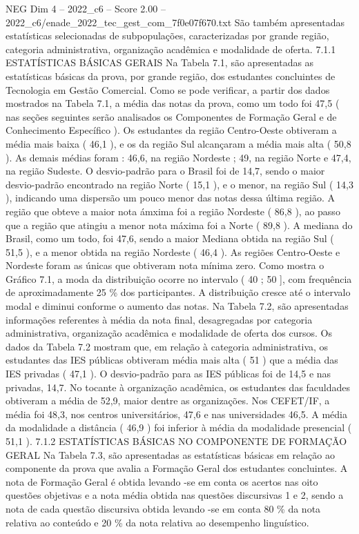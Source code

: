 \begin{textsample}{NEG Dim 4 – 2022\_c6 – Score 2.00 – 2022\_c6/enade\_2022\_tec\_gest\_com\_7f0e07f670.txt}
São também apresentadas estatísticas selecionadas de subpopulações, caracterizadas por grande região, categoria administrativa, organização acadêmica e modalidade de oferta. 7.1.1 ESTATÍSTICAS BÁSICAS GERAIS Na Tabela 7.1, são apresentadas as estatísticas básicas da prova, por grande região, dos estudantes concluintes de Tecnologia em Gestão Comercial.
Como se pode verificar, a partir dos dados mostrados na Tabela 7.1, a média das notas da prova, como um todo foi 47,5 ( nas seções seguintes serão analisados os Componentes de Formação Geral e de Conhecimento Específico ).
Os estudantes da região Centro-Oeste obtiveram a média mais baixa ( 46,1 ), e os da região Sul alcançaram a média mais alta ( 50,8 ).
As demais médias foram : 46,6, na região Nordeste ; 49, na região Norte e 47,4, na região Sudeste.
O desvio-padrão para o Brasil foi de 14,7, sendo o maior desvio-padrão encontrado na região Norte ( 15,1 ), e o menor, na região Sul ( 14,3 ), indicando uma dispersão um pouco menor das notas dessa última região.
A região que obteve a maior nota ámxima foi a região Nordeste ( 86,8 ), ao passo que a região que atingiu a menor nota máxima foi a Norte ( 89,8 ).
A mediana do Brasil, como um todo, foi 47,6, sendo a maior Mediana obtida na região Sul ( 51,5 ), e a menor obtida na região Nordeste ( 46,4 ).
As regiões Centro-Oeste e Nordeste foram as únicas que obtiveram nota mínima zero.
Como mostra o Gráfico 7.1, a moda da distribuição ocorre no intervalo ( 40 ; 50 ], com frequência de aproximadamente 25 \% dos participantes.
A distribuição cresce até o intervalo modal e diminui conforme o aumento das notas.
Na Tabela 7.2, são apresentadas informações referentes à média da nota final, desagregadas por categoria administrativa, organização acadêmica e modalidade de oferta dos cursos.
Os dados da Tabela 7.2 mostram que, em relação à categoria administrativa, os estudantes das IES públicas obtiveram média mais alta ( 51 ) que a média das IES privadas ( 47,1 ).
O desvio-padrão para as IES públicas foi de 14,5 e nas privadas, 14,7.
No tocante à organização acadêmica, os estudantes das faculdades obtiveram a média de 52,9, maior dentre as organizações.
Nos CEFET/IF, a média foi 48,3, nos centros universitários, 47,6 e nas universidades 46,5.
A média da modalidade a distância ( 46,9 ) foi inferior à média da modalidade presencial ( 51,1 ). 7.1.2 ESTATÍSTICAS BÁSICAS NO COMPONENTE DE FORMAÇÃO GERAL Na Tabela 7.3, são apresentadas as estatísticas básicas em relação ao componente da prova que avalia a Formação Geral dos estudantes concluintes.
A nota de Formação Geral é obtida levando -se em conta os acertos nas oito questões objetivas e a nota média obtida nas questões discursivas 1 e 2, sendo a nota de cada questão discursiva obtida levando -se em conta 80 \% da nota relativa ao conteúdo e 20 \% da nota relativa ao desempenho linguístico.

\end{textsample}

